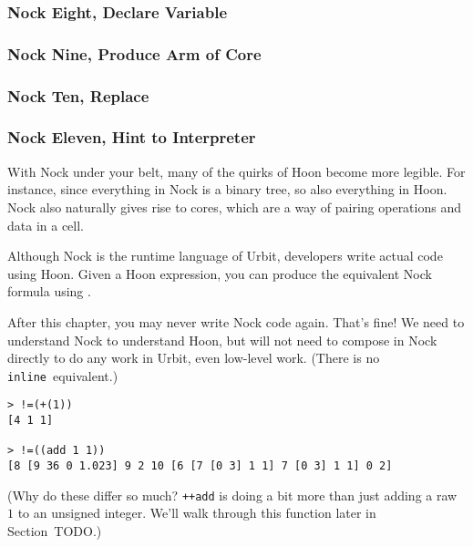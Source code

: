 \subsubsection[Nock Eight]{Nock Eight, Declare Variable}
\subsubsection[Nock Nine]{Nock Nine, Produce Arm of Core}
\subsubsection[Nock Ten]{Nock Ten, Replace}
\subsubsection[Nock Eleven]{Nock Eleven, Hint to Interpreter}


With Nock under your belt, many of the quirks of Hoon become more legible.  For instance, since everything in Nock is a binary tree, so also everything in Hoon.  Nock also naturally gives rise to cores, which are a way of pairing operations and data in a cell.

Although Nock is the runtime language of Urbit, developers write actual code using Hoon.  Given a Hoon expression, you can produce the equivalent Nock formula using \pzaptis.

After this chapter, you may never write Nock code again.  That's fine!  We need to understand Nock to understand Hoon, but will not need to compose in Nock directly to do any work in Urbit, even low-level work.  (There is no \texttt{inline}~equivalent.)

\begin{lstlisting}[style=nonumbers]
> !=(+(1))
[4 1 1]

> !=((add 1 1))
[8 [9 36 0 1.023] 9 2 10 [6 [7 [0 3] 1 1] 7 [0 3] 1 1] 0 2]
\end{lstlisting}

(Why do these differ so much?  \texttt{++add} is doing a bit more than just adding a raw $1$ to an unsigned integer.  We'll walk through this function later in Section~TODO.)


